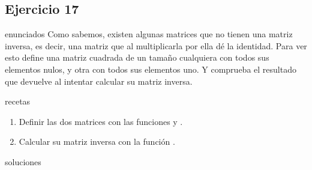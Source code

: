\subsection{Ejercicio 17}
\def\parte{enunciados}
\ifx\capitulo\parte
Como sabemos, existen algunas matrices que no tienen una matriz inversa, es decir, una matriz que al multiplicarla por ella dé la identidad. Para ver esto define una matriz cuadrada de un tamaño cualquiera con todos sus elementos nulos, y otra con todos sus elementos uno. Y comprueba el resultado que \mt devuelve al intentar calcular su matriz inversa.
\fi

\def\parte{recetas}
\ifx\capitulo\parte
\begin{enumerate}
\item Definir las dos matrices con las funciones  y .
\item Calcular su matriz inversa con la función .
\end{enumerate}
\fi

\def\parte{soluciones}
\ifx\capitulo\parte

\fi
